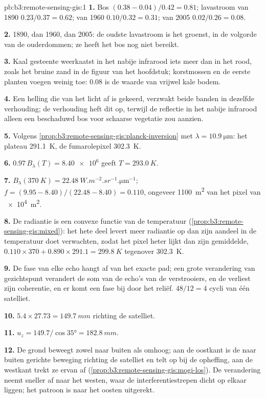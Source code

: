 \begin{solution}{pb:b3:remote-sensing-gis:1}
\textbf{1.} Bos $(0.38 - 0.04)/0.42 = 0.81$; lavastroom van 1890 $0.23/0.37 =
0.62$; van 1960 $0.10/0.32 = 0.31$; van 2005 $0.02/0.26 = 0.08$.

\textbf{2.} 1890, dan 1960, dan 2005: de oudste lavastroom is het groenst,
in de volgorde van de ouderdommen; ze heeft het bos nog niet bereikt.

\textbf{3.} Kaal gesteente weerkaatst in het nabije infrarood iets meer dan in het rood,
zoals het bruine zand in de figuur van het hoofdstuk; korstmossen en de eerste
planten voegen weinig toe: 0.08 is de waarde van vrijwel kale bodem.

\textbf{4.} Een helling die van het licht af is gekeerd, verzwakt beide banden in dezelfde
verhouding; de verhouding heft dit op, terwijl de reflectie in het nabije infrarood alleen
een beschaduwd bos voor schaarse vegetatie zou aanzien.

\textbf{5.} Volgens \cref{prop:b3:remote-sensing-gis:planck-inversion} met
$\lambda = \qty{10.9}{\micro\metre}$: het plateau \qty{291.1}{K}, de
fumarolepixel \qty{302.3}{K}.

\textbf{6.} $0.97\,B_\lambda(T) = \num{8.40e6}$ geeft $T = \qty{293.0}{K}$.

\textbf{7.} $B_\lambda(\qty{370}{K}) =
\qty{22.48}{W.m^{-2}.sr^{-1}.\micro\metre^{-1}}$; $f = (9.95 - 8.40)/(22.48
- 8.40) = 0.110$, ongeveer \qty{1100}{m^2} van het pixel van \qty{e4}{m^2}.

\textbf{8.} De radiantie is een convexe functie van de temperatuur
(\cref{prop:b3:remote-sensing-gis:mixed}): het hete deel levert meer radiantie op
dan zijn aandeel in de temperatuur doet verwachten, zodat het pixel heter lijkt dan zijn gemiddelde,
$0.110\times370 + 0.890\times291.1 = \qty{299.8}{K}$ tegenover
\qty{302.3}{K}.

\textbf{9.} De fase van elke echo hangt af van het exacte pad; een grote
verandering van gezichtspunt verandert de som van de echo's van de verstrooiers, en de
 verliest zijn coherentie, en er komt een fase bij door het reliëf.
$48/12 = 4$ cycli van één satelliet.

\textbf{10.} $5.4\times27.73 = \qty{149.7}{mm}$ richting de satelliet.

\textbf{11.} $u_z = 149.7/\cos\ang{35} = \qty{182.8}{mm}$.

\textbf{12.} De grond beweegt zowel naar buiten als omhoog; aan de oostkant is de
naar buiten gerichte beweging richting de satelliet en telt op bij de opheffing, aan de westkant
trekt ze ervan af (\cref{prop:b3:remote-sensing-gis:mogi-los}). De verandering
neemt sneller af naar het westen, waar de interferentiestrepen dicht op elkaar liggen; het patroon is
naar het oosten uitgerekt.


\end{solution}
